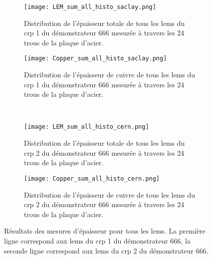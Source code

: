                 \begin{figure}[htpb]
                    \begin{subfigure}[t]{0.48\textwidth}
                        \texttt{[image: LEM\_sum\_all\_histo\_saclay.png]}
                        \caption{Distribution de l'épaisseur totale de tous les \glspl{lem} du \gls{crp} 1 du démonstrateur 666 mesurée à travers les 24 trous de la plaque d'acier.}
                        \label{fig::distri_lem_saclay}
                    \end{subfigure}
                    \hfill
                    \begin{subfigure}[t]{0.48\textwidth}
                        \texttt{[image: Copper\_sum\_all\_histo\_saclay.png]}
                        \caption{Distribution de l'épaisseur de cuivre de tous les \glspl{lem} du \gls{crp} 1 du démonstrateur 666 mesurée à travers les 24 trous de la plaque d'acier.}
                        \label{fig::distri_cuivre_saclay}
                    \end{subfigure}\\
                    \begin{subfigure}[b]{0.48\textwidth}
                        \texttt{[image: LEM\_sum\_all\_histo\_cern.png]}
                        \caption{Distribution de l'épaisseur totale de tous les \glspl{lem} du \gls{crp} 2 du démonstrateur 666 mesurée à travers les 24 trous de la plaque d'acier.}
                        \label{fig::distri_lem_cern}
                    \end{subfigure}
                    \hfill
                    \begin{subfigure}[b]{0.48\textwidth}
                        \texttt{[image: Copper\_sum\_all\_histo\_cern.png]}
                        \caption{Distribution de l'épaisseur de cuivre de tous les \glspl{lem} du \gls{crp} 2 du démonstrateur 666 mesurée à travers les 24 trous de la plaque d'acier.}
                        \label{fig::distri_cuivre_cern}
                    \end{subfigure}
                    \caption[Résultats des mesures d'épaisseur pour tous les \glspl{lem}.]{Résultats des mesures d'épaisseur pour tous les \glspl{lem}. La première ligne correspond aux \glspl{lem} du \gls{crp} 1 du démonstrateur 666, la seconde ligne correspond aux \glspl{lem} du \gls{crp} 2 du démonstrateur 666.}
                    \label{fig::epaisseur_tous_lem}
                \end{figure}
                
